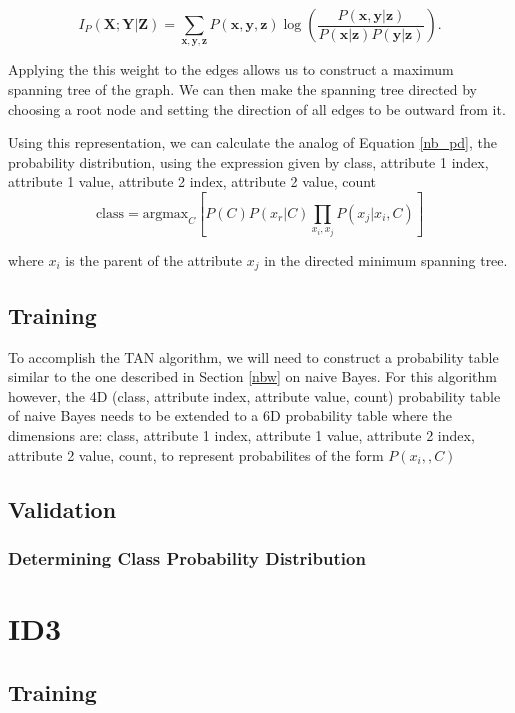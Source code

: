 \documentclass{article}
\newcommand{\ve}[1]{\boldsymbol{\mathbf{#1}}}
\begin{document}
		\begin{equation*}
			I_P(\ve{X};\ve{Y} | \ve{Z}) = \sum_{\ve{x},\ve{y},\ve{z}} P(\ve{x},\ve{y}, \ve{z}) \log \left( \frac{P(\ve{x},\ve{y} | \ve{z})}{P(\ve{x}|\ve{z})P(\ve{y}|\ve{z})} \right).
			\label{cmi}
		\end{equation*}
		
		Applying the this weight to the edges allows us to construct a maximum spanning tree of the graph. 
		We can then make the spanning tree directed by choosing a root node and setting the direction of all edges to be outward from it.
		
		Using this representation, we can calculate the analog of Equation \ref{nb_pd}, the probability distribution, using the expression given by \cite{Zheng2010}
		class, attribute 1 index, attribute 1 value, attribute 2 index, attribute 2 value, count
		\begin{equation}
			\text{class} = \text{argmax}_C \left[ P(C) P(x_r | C) \prod_{x_i,x_j} P(x_j | x_i , C) \right]
		\end{equation}
		
		where $x_i$ is the parent of the attribute $x_j$ in the directed minimum spanning tree. 

	\subsection{Training}
		
		To accomplish the TAN algorithm, we will need to construct a probability table similar to the one described in Section \ref{nbw} on naive Bayes. For this algorithm however, the 4D (class, attribute index, attribute value, count) probability table of naive Bayes needs to be extended to a 6D probability table where the dimensions are: class, attribute 1 index, attribute 1 value, attribute 2 index, attribute 2 value, count, to represent probabilites of the form $P(x_i,,C)$
		
	\subsection{Validation}
		\subsubsection{Determining Class Probability Distribution}
\section{ID3}
	\subsection{Training}
\end{document}
